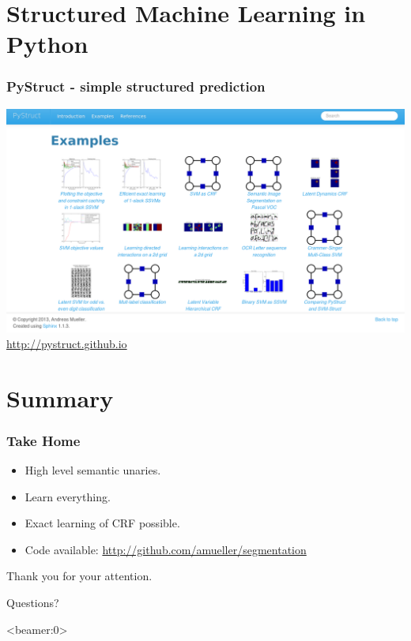 \documentclass[final,ignorenonframetext,compress]{beamer}
\begin{document}
    \section*{Structured Machine Learning in Python}
    \begin{frame}
        \frametitle{PyStruct - simple structured prediction}
        \begin{center}
            \includegraphics[width=\linewidth]{images/example_gallery}\\
            \url{http://pystruct.github.io}
        \end{center}
    \end{frame}

    \section*{Summary}
    \begin{frame}
        \frametitle{Take Home}
        \begin{itemize}
            \item High level semantic unaries.
            \item Learn everything.
            \item Exact learning of CRF possible.
            \item Code available: \url{http://github.com/amueller/segmentation}
        \end{itemize}
    \end{frame}
    
    \begin{frame}
        \begin{center}
            Thank you for your attention.

            Questions?
        \end{center}
    \end{frame}
    \begin{frame}<beamer:0>
        
        
    \end{frame}

	
\end{document}
